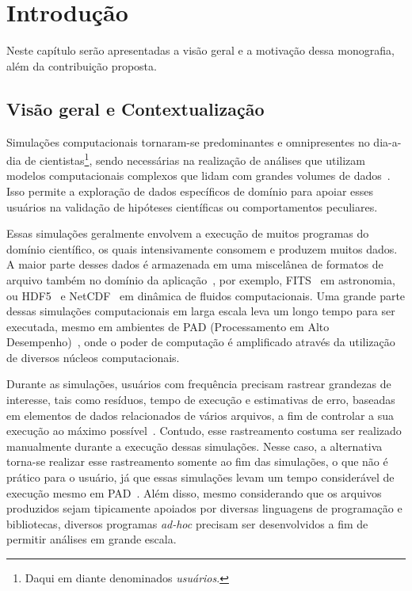 
\chapter{Introdução}

Neste capítulo serão apresentadas a visão geral e a motivação dessa monografia, além da contribuição proposta.

\section{Visão geral e Contextualização}

Simulações computacionais tornaram-se predominantes e omnipresentes no dia-a-dia de cientistas\footnote{Daqui em diante denominados \textit{usuários}.}, sendo necessárias na realização de análises que utilizam modelos computacionais complexos que lidam com grandes volumes de dados~\cite{silva2015analyzing}. Isso permite a exploração de dados específicos de domínio para apoiar esses usuários na validação de hipóteses científicas ou comportamentos peculiares.

Essas simulações geralmente envolvem a execução de muitos programas do domínio científico, os quais intensivamente consomem e produzem muitos dados. A maior parte desses dados é armazenada em uma miscelânea de formatos de arquivo também no domínio da aplicação~\cite{silva2015analyzing}, por exemplo,  FITS~\cite{greisen2002representations} em astronomia, ou  HDF5~\cite{folk1999hdf5} e  NetCDF~\cite{rew1990netcdf} em dinâmica de fluidos computacionais.
Uma grande parte dessas simulações computacionais em larga escala leva um longo tempo para ser executada, mesmo em ambientes de  PAD (Processamento em Alto Desempenho)~\cite{silva2017raw}, onde o poder de computação é amplificado através da utilização de diversos núcleos computacionais.

Durante as simulações, usuários com frequência precisam rastrear grandezas de interesse, tais como resíduos, tempo de execução e estimativas de erro, baseadas em elementos de dados relacionados de vários arquivos, a fim de controlar a sua execução ao máximo possível~\cite{silva2016situ}. Contudo, esse rastreamento costuma ser realizado manualmente durante a execução dessas simulações. Nesse caso, a alternativa torna-se realizar esse rastreamento somente ao fim das simulações, o que não é prático para o usuário, já que essas simulações levam um tempo considerável de execução mesmo em PAD~\cite{silva2017raw}. Além disso, mesmo considerando que os arquivos produzidos sejam tipicamente apoiados por diversas linguagens de programação e bibliotecas, diversos programas \textit{ad-hoc} precisam ser desenvolvidos a fim de permitir análises em grande escala.

